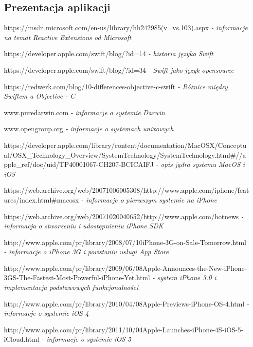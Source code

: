 \documentclass[12pt,oneside,a4paper]{report}
\begin{document}
\subsection{Prezentacja aplikacji}
\begin{thebibliography}{50}
 https://msdn.microsoft.com/en-us/library/hh242985(v=vs.103).aspx
\emph{- informacje na temat Reactive Extensions od Microsoft}

 https://developer.apple.com/swift/blog/?id=14
\emph{- historia języka Swift}

 https://developer.apple.com/swift/blog/?id=34
\emph{- Swift jako język opensource}

 https://redwerk.com/blog/10-differences-objective-c-swift
\emph{- Różnice między Swiftem a Objective - C}

 www.puredarwin.com 
\emph{ - informacje o systemie Darwin}

 www.opengroup.org \emph{ - informacje o systemach unixowych}

 https://developer.apple.com/library/content/documentation/MacOSX/Conceptual/OSX\_Technology\_Overview/SystemTechnology/SystemTechnology.html\#//apple\_ref/doc/uid/TP40001067-CH207-BCICAIFJ
\emph{ - opis jądra systemu MacOS i iOS}

 https://web.archive.org/web/20071006005308/http://www.apple.com/iphone/features/index.html\#macosx
\emph{ - informacje o pierwszym systemie na iPhone}

 https://web.archive.org/web/20071020040652/http://www.apple.com/hotnews
\emph{ - informacja o stworzeniu i udostępnieniu iPhone SDK}

 http://www.apple.com/pr/library/2008/07/10iPhone-3G-on-Sale-Tomorrow.html
\emph{ - informacje o iPhone 3G i powstaniu usługi App Store}

 http://www.apple.com/pr/library/2009/06/08Apple-Announces-the-New-iPhone-3GS-The-Fastest-Most-Powerful-iPhone-Yet.html
\emph{ - system iPhone 3.0 i implementacja podstawowych funkcjonalności}

http://www.apple.com/pr/library/2010/04/08Apple-Previews-iPhone-OS-4.html
\emph{ - informacje o systemie iOS 4}

http://www.apple.com/pr/library/2011/10/04Apple-Launches-iPhone-4S-iOS-5-iCloud.html
\emph{ - informacje o systemie iOS 5}


\end{thebibliography}
\end{document}
